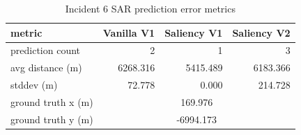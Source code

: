 \begin{table}[ht]
\centering
\caption{Incident 6 SAR prediction error metrics}
\label{tab:sar-incident-6}
\begin{tabular}{lrrr}
\hline
metric & Vanilla V1 & Saliency V1 & Saliency V2 \\
\hline
prediction count & 2 & 1 & 3 \\
avg distance (m) & 6268.316 & 5415.489 & 6183.366 \\
stddev (m) & 72.778 & 0.000 & 214.728 \\
ground truth x (m) & \multicolumn{3}{c}{169.976} \\
ground truth y (m) & \multicolumn{3}{c}{-6994.173} \\
\hline
\end{tabular}
\end{table}
